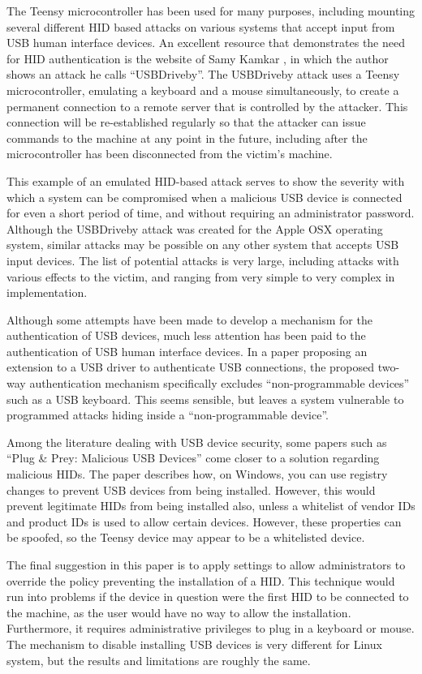 \documentclass[pagenumbers]{ieee}
\begin{document}
The Teensy microcontroller has been used for many purposes, including mounting several different HID based attacks on various systems that accept input from USB human interface devices. An excellent resource that demonstrates the need for HID authentication is the website of Samy Kamkar \cite{samy}, in which the author shows an attack he calls ``USBDriveby''. The USBDriveby attack uses a Teensy microcontroller, emulating a keyboard and a mouse simultaneously,  to create a permanent connection to a remote server that is controlled by the attacker.  This connection will be re-established regularly so that the attacker can issue commands to the machine at any point in the future, including after the microcontroller has been disconnected from the victim's machine.

This example of an emulated HID-based attack serves to show the severity with which a system can be compromised when a malicious USB device is connected for even a short period of time, and without requiring an administrator password. Although the USBDriveby attack was created for the Apple OSX operating system, similar attacks may be possible on any other system that accepts USB input devices. The list of potential attacks is very large, including attacks with various effects to the victim, and ranging from very simple to very complex in implementation.

Although some attempts have been made to develop a mechanism for the authentication of USB devices, much less attention has been paid to the authentication of USB human interface devices. In a paper \cite{wang} proposing an extension to a USB driver to authenticate USB connections, the proposed two-way authentication mechanism specifically excludes ``non-programmable devices'' such as a USB keyboard. This seems sensible, but leaves a system vulnerable to programmed attacks hiding inside a ``non-programmable device''.

Among the literature dealing with USB device security, some papers such as ``Plug \& Prey: Malicious USB Devices'' \cite{crenshaw} come closer to a solution regarding malicious HIDs. The paper describes how, on Windows, you can use registry changes to prevent USB devices from being installed. However, this would prevent legitimate HIDs from being installed also, unless a whitelist of vendor IDs and product IDs is used to allow certain devices. However, these properties can be spoofed, so the Teensy device may appear to be a whitelisted device.

The final suggestion in this paper is to apply settings to allow administrators to override the policy preventing the installation of a HID. This technique would run into problems if the device in question were the first HID to be connected to the machine, as the user would have no way to allow the installation. Furthermore, it requires administrative privileges to plug in a keyboard or mouse. The mechanism to disable installing USB devices is very different for Linux system, but the results and limitations are roughly the same.
\end{document}
